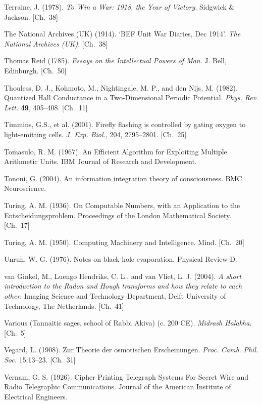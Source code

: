 \begin{list}{}{%
  \setlength{\leftmargin}{2em}%
  \setlength{\itemindent}{-2em}%
  \setlength{\itemsep}{0.35\baselineskip}%
  \setlength{\parsep}{0pt}%
  \setlength{\topsep}{0.5em}}
\item Terraine, J. (1978). \textit{To Win a War: 1918, the Year of Victory}. Sidgwick \& Jackson. \hfill {\scriptsize [Ch.~38]}
\item The National Archives (UK) (1914). `BEF Unit War Diaries, Dec 1914'. \textit{The National Archives (UK)}. \hfill {\scriptsize [Ch.~38]}
\item Thomas Reid (1785). \textit{Essays on the Intellectual Powers of Man}. J. Bell, Edinburgh. \hfill {\scriptsize [Ch.~50]}
\item Thouless, D. J., Kohmoto, M., Nightingale, M. P., and den Nijs, M. (1982). Quantized Hall Conductance in a Two-Dimensional Periodic Potential. \textit{Phys. Rev. Lett.} \textbf{49}, 405–408. \hfill {\scriptsize [Ch.~11]}
\item Timmins, G.S., et al. (2001). Firefly flashing is controlled by gating oxygen to light-emitting cells. \textit{J. Exp. Biol.}, 204, 2795–2801. \hfill {\scriptsize [Ch.~25]}
\item Tomasulo, R. M. (1967). An Efficient Algorithm for Exploiting Multiple Arithmetic Units. IBM Journal of Research and Development.
\item Tononi, G. (2004). An information integration theory of consciousness. BMC Neuroscience.
\item Turing, A. M. (1936). On Computable Numbers, with an Application to the Entscheidungsproblem. Proceedings of the London Mathematical Society. \hfill {\scriptsize [Ch.~17]}
\item Turing, A. M. (1950). Computing Machinery and Intelligence. Mind. \hfill {\scriptsize [Ch.~20]}
\item Unruh, W. G. (1976). Notes on black-hole evaporation. Physical Review D.
\item van Ginkel, M., Luengo Hendriks, C. L., and van Vliet, L. J. (2004). \textit{A short introduction to the Radon and Hough transforms and how they relate to each other}. Imaging Science and Technology Department, Delft University of Technology, The Netherlands. \hfill {\scriptsize [Ch.~41]}
\item Various (Tannaitic sages, school of Rabbi Akiva) (c. 200 CE). \textit{Midrash Halakha}. \hfill {\scriptsize [Ch.~5]}
\item Vegard, L. (1908). Zur Theorie der osmotischen Erscheinungen. \textit{Proc. Camb. Phil. Soc.} 15:13–23. \hfill {\scriptsize [Ch.~31]}
\item Vernam, G. S. (1926). Cipher Printing Telegraph Systems For Secret Wire and Radio Telegraphic Communications. Journal of the American Institute of Electrical Engineers.

\end{list}
